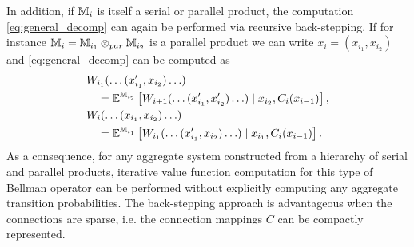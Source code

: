 \documentclass[conference]{IEEEtran}
\begin{document}
In addition, if $\mathbb{M}_{i}$ is itself a serial or parallel product, the computation \eqref{eq:general_decomp} can again be performed via recursive back-stepping. If for instance $\mathbb{M}_{i} = \mathbb{M}_{i_1} \otimes_{par} \mathbb{M}_{i_2}$ is a parallel product we can write $x_i = (x_{i_1}, x_{i_2})$ and \eqref{eq:general_decomp} can be computed as
\begin{equation}
\begin{aligned}
	& W_{i_1}(\ldots (x_{i_1}', x_{i_2}) \ldots) \\
	& \quad = \mathbb{E}^{\mathbb{M}_{i_2}} \left[ W_{i+1}(\ldots (x_{i_1}', x_{i_2}') \ldots) \mid x_{i_2}, C_i(x_{i-1}) \right], \\
	& W_{i}(\ldots (x_{i_1}, x_{i_2}) \ldots) \\
	& \quad = \mathbb{E}^{\mathbb{M}_{i_1}} \left[ W_{i_1}(\ldots (x_{i_1}', x_{i_2}) \ldots) \mid x_{i_1}, C_i(x_{i-1}) \right].
\end{aligned}
\end{equation}
As a consequence, for any aggregate system constructed from a hierarchy of serial and parallel products, iterative value function computation for this type of Bellman operator can be performed without explicitly computing any aggregate transition probabilities. The back-stepping approach is advantageous when the connections are sparse, i.e. the connection mappings $C$ can be compactly represented.
\end{document}
